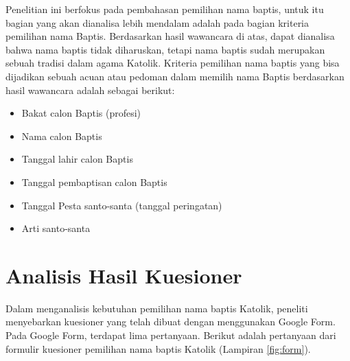 		Penelitian ini berfokus pada pembahasan pemilihan nama baptis, untuk itu bagian yang akan dianalisa lebih mendalam adalah pada bagian kriteria pemilihan nama Baptis. Berdasarkan hasil wawancara di atas, dapat dianalisa bahwa nama baptis tidak diharuskan, tetapi nama baptis sudah merupakan sebuah tradisi dalam agama Katolik. Kriteria pemilihan nama baptis yang bisa dijadikan sebuah acuan atau pedoman dalam memilih nama Baptis berdasarkan hasil wawancara adalah sebagai berikut:
	
	\begin{itemize}
		\item Bakat calon Baptis (profesi)
		\item Nama calon Baptis
		\item Tanggal lahir calon Baptis
		\item Tanggal pembaptisan calon Baptis
		\item Tanggal Pesta santo-santa (tanggal peringatan)
		\item Arti santo-santa
	\end{itemize}


\section{Analisis Hasil Kuesioner}
\label{sec:analisiskuesioner}

Dalam menganalisis kebutuhan pemilihan nama baptis Katolik, peneliti menyebarkan kuesioner yang telah dibuat dengan menggunakan Google Form. Pada Google Form, terdapat lima pertanyaan. Berikut adalah pertanyaan dari formulir kuesioner pemilihan nama baptis Katolik (Lampiran \ref{fig:form}).


